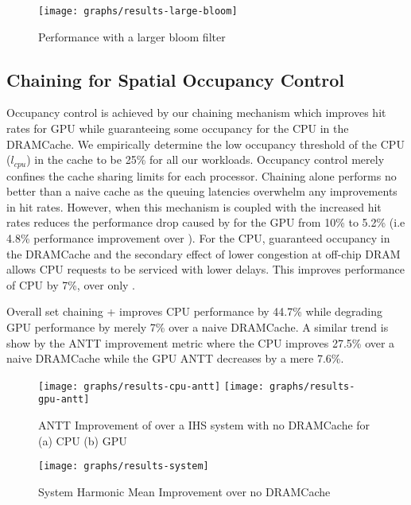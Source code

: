 \begin{figure}[!htb]
    \centering
    \texttt{[image: graphs/results-large-bloom]}
    \caption{Performance with a larger bloom filter}
    \label{large-bloom}
\end{figure}

\subsection{Chaining for Spatial Occupancy Control}
Occupancy control is achieved by our chaining mechanism which improves hit rates for GPU while guaranteeing some occupancy for the CPU in the DRAMCache. We empirically determine the low occupancy threshold of the CPU (\textit{$l_{cpu}$}) in the cache to be 25\% for all our workloads. Occupancy control merely confines the cache sharing limits for each processor. Chaining alone performs no better than a naive cache as the queuing latencies overwhelm any improvements in hit rates. However, when this mechanism is coupled with \prioname the increased hit rates reduces the performance drop caused by \prioname for the GPU from 10\% to 5.2\% (i.e 4.8\% performance improvement over \prioname). For the CPU, guaranteed occupancy in the DRAMCache and the secondary effect of lower congestion at off-chip DRAM allows CPU requests to be serviced with lower delays. This improves performance of CPU by 7\%, over only \prioname.
\par Overall set chaining + \prioname improves CPU performance by 44.7\% while degrading GPU performance by merely 7\% over a naive DRAMCache. A similar trend is show by the ANTT improvement metric where the CPU improves 27.5\% over a naive DRAMCache while the GPU ANTT decreases by a mere 7.6\%. 

\begin{figure}[!htb]
    \centering
    \texttt{[image: graphs/results-cpu-antt]}
    \texttt{[image: graphs/results-gpu-antt]}
    \caption{ANTT Improvement of \cachename over a IHS system with no DRAMCache for (a) CPU (b) GPU}
    \label{results-antt-graph}
\end{figure}

\begin{figure}[!htb]
    \centering
    \texttt{[image: graphs/results-system]}
    \caption{System Harmonic Mean Improvement over no DRAMCache}
    \label{results-system}
\end{figure}

